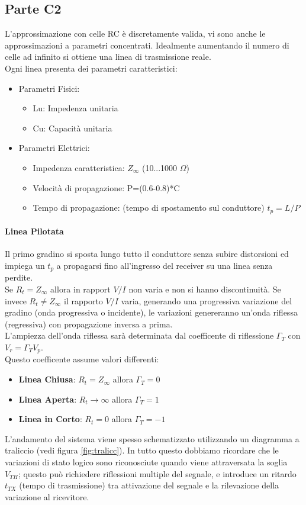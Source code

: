 \documentclass[12pt]{article}
\begin{document}
\subsection{Parte C2}\label{c2}
L'approssimazione con celle RC è discretamente valida, vi sono anche le approssimazioni a parametri concentrati. Idealmente aumentando il numero di celle ad infinito si ottiene una linea di trasmissione reale.\\
Ogni linea presenta dei parametri caratteristici:
\begin{itemize}
  \item Parametri Fisici:
  \begin{itemize}
    \item Lu: Impedenza unitaria
    \item Cu: Capacità unitaria
  \end{itemize}
  \item Parametri Elettrici:
  \begin{itemize}
    \item Impedenza caratteristica: $Z_{\infty}$ (10...1000 $\Omega$)
    \item Velocità di propagazione: P=(0.6-0.8)*C
    \item Tempo di propagazione: (tempo di spostamento sul conduttore) $t_{p}=L/P$
  \end{itemize}
\end{itemize}

\paragraph{Linea Pilotata}
Il primo gradino si sposta lungo tutto il conduttore senza subire distorsioni ed impiega un $t_{p}$ a propagarsi fino all'ingresso del receiver su una linea senza perdite.\\
Se $R_{t}=Z_{\infty}$ allora in rapport $V/I$ non varia e non si hanno discontinuità. Se invece $R_{t} \neq Z_{\infty}$ il rapporto $V/I$ varia, generando una progressiva variazione del gradino (onda progressiva o incidente), le variazioni genereranno un'onda riflessa (regressiva) con propagazione inversa a prima.\\
L'ampiezza dell'onda riflessa sarà determinata dal coefficente di riflessione $\Gamma_{T}$ con $V_{r}=\Gamma_{T}V_{p}$.\\
Questo coefficente assume valori differenti:
\begin{itemize}
  \item \textbf{Linea Chiusa}: $R_{t}=Z_{\infty}$ allora $\Gamma_{T}=0$
  \item \textbf{Linea Aperta}: $R_{t}\rightarrow\infty$ allora $\Gamma_{T}=1$
  \item \textbf{Linea in Corto}: $R_{t}=0$ allora $\Gamma_{T}=-1$
\end{itemize}
L'andamento del sistema viene spesso schematizzato utilizzando un diagramma a traliccio (vedi figura \ref{fig:tralicc}). In tutto questo dobbiamo ricordare che le variazioni di stato logico sono riconosciute quando viene attraversata la soglia $V_{TH}$; questo può richiedere riflessioni multiple del segnale, e introduce un ritardo $t_{TX}$ (tempo di trasmissione) tra attivazione del segnale e la rilevazione della variazione al ricevitore.
\end{document}
